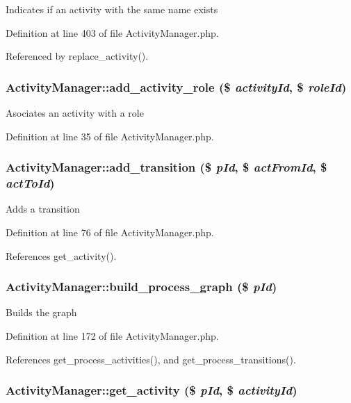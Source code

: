 Indicates if an activity with the same name exists 

Definition at line 403 of file Activity\-Manager.php.

Referenced by replace\_\-activity().
\subsubsection{\setlength{\rightskip}{0pt plus 5cm}Activity\-Manager::add\_\-activity\_\-role (\$ {\em activity\-Id}, \$ {\em role\-Id})}\label{classActivityManager_a2}


Asociates an activity with a role 

Definition at line 35 of file Activity\-Manager.php.
\subsubsection{\setlength{\rightskip}{0pt plus 5cm}Activity\-Manager::add\_\-transition (\$ {\em p\-Id}, \$ {\em act\-From\-Id}, \$ {\em act\-To\-Id})}\label{classActivityManager_a6}


Adds a transition 

Definition at line 76 of file Activity\-Manager.php.

References get\_\-activity().
\subsubsection{\setlength{\rightskip}{0pt plus 5cm}Activity\-Manager::build\_\-process\_\-graph (\$ {\em p\-Id})}\label{classActivityManager_a12}


Builds the graph 

Definition at line 172 of file Activity\-Manager.php.

References get\_\-process\_\-activities(), and get\_\-process\_\-transitions().
\subsubsection{\setlength{\rightskip}{0pt plus 5cm}Activity\-Manager::get\_\-activity (\$ {\em p\-Id}, \$ {\em activity\-Id})}\label{classActivityManager_a16}


